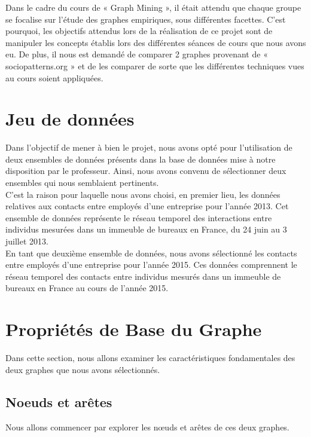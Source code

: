 \documentclass{article}
\begin{document}
Dans le cadre du cours de « Graph Mining », il était attendu que chaque groupe se focalise sur l’étude des graphes empiriques, sous différentes facettes. C’est pourquoi, les objectifs attendus lors de la réalisation de ce projet sont de manipuler les concepts établis lors des différentes séances de cours que nous avons eu. De plus, il nous est demandé de comparer 2 graphes provenant de « sociopatterns.org » et de les comparer de sorte que les différentes techniques vues au cours soient appliquées.

\section{Jeu de données}

Dans l'objectif de mener à bien le projet, nous avons opté pour l'utilisation de deux ensembles de données présents dans la base de données mise à notre disposition par le professeur. Ainsi, nous avons convenu de sélectionner deux ensembles qui nous semblaient pertinents. \\

C'est la raison pour laquelle nous avons choisi, en premier lieu, les données relatives aux contacts entre employés d'une entreprise pour l'année 2013. Cet ensemble de données représente le réseau temporel des interactions entre individus mesurées dans un immeuble de bureaux en France, du 24 juin au 3 juillet 2013. \\

En tant que deuxième ensemble de données, nous avons sélectionné les contacts entre employés d'une entreprise pour l'année 2015. Ces données comprennent le réseau temporel des contacts entre individus mesurés dans un immeuble de bureaux en France au cours de l'année 2015.

\section{Propriétés de Base du Graphe}

Dans cette section, nous allons examiner les caractéristiques fondamentales des deux graphes que nous avons sélectionnés.

\subsection{Noeuds et arêtes}

\noindent
Nous allons commencer par explorer les nœuds et arêtes de ces deux graphes. \\
\end{document}
